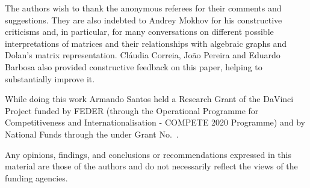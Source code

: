 \documentclass[sigplan,screen]{acmart}
\begin{document}
\begin{acks} %

The authors wish to thank the anonymous referees for their comments and suggestions. They are also indebted to Andrey Mokhov for his constructive criticisms and, in particular, for many conversations on different possible interpretations of matrices and their relationships with algebraic graphs and Dolan's matrix representation.
Cláudia Correia, João Pereira and Eduardo Barbosa also provided constructive feedback on this paper, helping to substantially improve it. %

While doing this work Armando Santos held a Research Grant of the DaVinci Project funded by FEDER (through the Operational Programme for Competitiveness and Internationalisation - COMPETE 2020 Programme) and by National Funds through the
under Grant No.~.

Any opinions, findings, and conclusions or recommendations expressed in this material are those of the authors and do not necessarily reflect the views of the funding agencies.
\end{acks}

%

\end{document}
